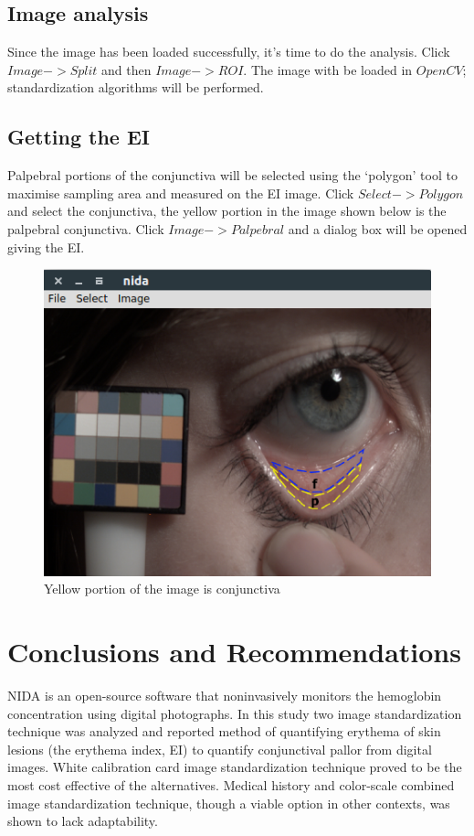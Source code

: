 \documentclass[peerreview]{IEEEtran}
\begin{document}
\subsection{Image analysis}
Since the image has been loaded successfully, it's time to do the analysis. Click $Image->Split$ and then $Image->ROI$. 
The image with be loaded in $OpenCV$; standardization algorithms will be performed.

\subsection{Getting the EI}
Palpebral portions of the conjunctiva will be selected using the `polygon' tool to maximise sampling area and measured on the EI image.
Click $Select->Polygon$ and select the conjunctiva, the yellow portion in the image shown below is the palpebral conjunctiva. Click 
$Image->Palpebral$ and a dialog box will be opened giving the EI.
\begin{figure}[htp]
 \centering
 \includegraphics[width=0.5\linewidth]{main.png}
 \caption{Yellow portion of the image is conjunctiva}
 \label{fig:3}
\end{figure} 

\section{Conclusions and Recommendations}
NIDA is an open-source software that noninvasively monitors the hemoglobin concentration using digital photographs.
In this study two image standardization technique was analyzed and reported method of quantifying erythema of skin 
lesions (the erythema index, EI) to quantify conjunctival pallor from digital images. White calibration card image 
standardization technique proved to be the most cost effective of the alternatives. Medical history and color-scale combined 
image standardization technique, though a viable option in other contexts, was shown to lack adaptability.
\end{document}
